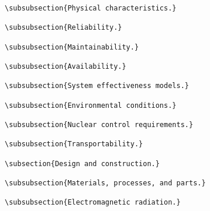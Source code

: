 \begin{itemize}
\begin{small}
\begin{verbatim}
\subsubsection{Physical characteristics.}

\subsubsection{Reliability.}

\subsubsection{Maintainability.}

\subsubsection{Availability.}

\subsubsection{System effectiveness models.}

\subsubsection{Environmental conditions.}

\subsubsection{Nuclear control requirements.}

\subsubsection{Transportability.}

\subsection{Design and construction.}

\subsubsection{Materials, processes, and parts.}

\subsubsection{Electromagnetic radiation.}


\end{verbatim}
\end{small}
\end{itemize}
